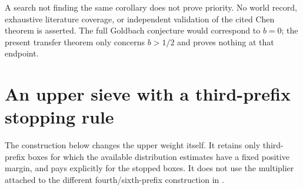\documentclass[11pt]{article}
\begin{document}
A search not finding the same corollary does not prove priority.
No world record, exhaustive literature coverage, or independent
validation of the cited Chen theorem is asserted. The full Goldbach
conjecture would correspond to $b=0$; the present transfer theorem
only concerns $b>1/2$ and proves nothing at that endpoint.

\section{An upper sieve with a third-prefix stopping rule}
\label{sec:pruned-upper-sieve}

The construction below changes the upper weight itself. It retains
only third-prefix boxes for which the available distribution estimates
have a fixed positive margin, and pays explicitly for the stopped boxes.
It does not use the multiplier attached to the different fourth/sixth-prefix
construction in \cite{Lichtman2025}.
\end{document}
